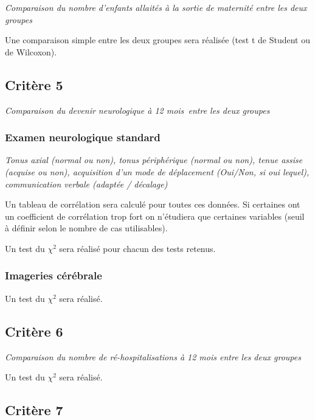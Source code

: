 \documentclass[
  10 pt,
  a4paperpaper,
  french]{scrartcl}
\begin{document}
\emph{Comparaison du nombre d'enfants allaités à la sortie de maternité
entre les deux groupes}

Une comparaison simple entre les deux groupes sera réalisée (test t de
Student ou de Wilcoxon).

\hypertarget{crituxe8re-5}{%
\subsection{Critère 5}\label{crituxe8re-5}}

\emph{Comparaison du devenir neurologique à 12 mois~entre les deux
groupes}

\hypertarget{examen-neurologique-standard}{%
\subsubsection{Examen neurologique
standard}\label{examen-neurologique-standard}}

\emph{Tonus axial (normal ou non), tonus périphérique (normal ou non),
tenue assise (acquise ou non), acquisition d'un mode de déplacement
(Oui/Non, si oui lequel), communication verbale (adaptée / décalage)}

Un tableau de corrélation sera calculé pour toutes ces données. Si
certaines ont un coefficient de corrélation trop fort on n'étudiera que
certaines variables (seuil à définir selon le nombre de cas
utilisables).

Un test du \(\chi^2\) sera réalisé pour chacun des tests retenus.

\hypertarget{imageries-cuxe9ruxe9brale}{%
\subsubsection{Imageries cérébrale}\label{imageries-cuxe9ruxe9brale}}

Un test du \(\chi^2\) sera réalisé.

\hypertarget{crituxe8re-6}{%
\subsection{Critère 6}\label{crituxe8re-6}}

\emph{Comparaison du nombre de ré-hospitalisations à 12 mois entre les
deux groupes}

Un test du \(\chi^2\) sera réalisé.

\hypertarget{crituxe8re-7}{%
\subsection{Critère 7}\label{crituxe8re-7}}
\end{document}
